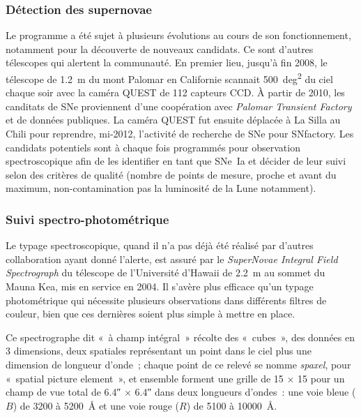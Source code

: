 \documentclass[../main/main.tex]{subfiles}
\begin{document}
\subsubsection{Détection des supernovae}\label{sssec:snfdetec}

Le programme a été sujet à plusieurs évolutions au cours de son fonctionnement,
notamment pour la découverte de nouveaux candidats. Ce sont d'autres télescopes
qui alertent la communauté. En premier lieu, jusqu'à fin 2008, le télescope de
\SI{1.2}{m} du mont Palomar en Californie \citep{rabinowitz2003} scannait
\SI{500}{deg^2} du ciel chaque soir avec la caméra QUEST de 112 capteurs CCD. À
partir de 2010, les canditats de SNe proviennent d'une coopération avec
\textit{Palomar Transient Factory} \citep[PTF,][]{law2009} et de données
publiques. La caméra QUEST fut ensuite déplacée à La Silla au Chili
\citep[LSQ,][]{hadjiyska2012} pour reprendre, mi-2012, l'activité de recherche
de SNe pour SNfactory. Les candidats potentiels sont à chaque fois programmés
pour observation spectroscopique afin de les identifier en tant que SNe~Ia et
décider de leur suivi selon des critères de qualité (nombre de points de mesure,
proche et avant du maximum, non-contamination pas la luminosité de la Lune
notamment).

\subsubsection{Suivi spectro-photométrique}\label{sssec:snfspectro}

Le typage spectroscopique, quand il n'a pas déjà été réalisé par d'autres
collaboration ayant donné l'alerte, est assuré par le \textit{SuperNovae
Integral Field Spectrograph} \citep[SNIFS,][]{lantz2004} du télescope de
l'Université d'Hawaii de \SI{2.2}{m} au sommet du Mauna Kea, mis en service en
2004. Il s'avère plus efficace qu'un typage photométrique qui nécessite
plusieurs observations dans différents filtres de couleur, bien que ces
dernières soient plus simple à mettre en place.

Ce spectrographe dit «~à champ intégral~» récolte des «~cubes~», des données en
3 dimensions, deux spatiales représentant un point dans le ciel plus une
dimension de longueur d'onde~; chaque point de ce relevé se nomme
\textit{spaxel}, pour «~spatial picture element~», et ensemble forment une
grille de 15 $\times$ 15 pour un champ de vue total de \ang{;;6.4} $\times$
\ang{;;6.4} dans deux longueurs d'ondes~: une voie bleue ($B$) de 3200 à
\SI{5200}{\angstrom} et une voie rouge ($R$) de 5100 à \SI{10000}{\angstrom}.
\end{document}
